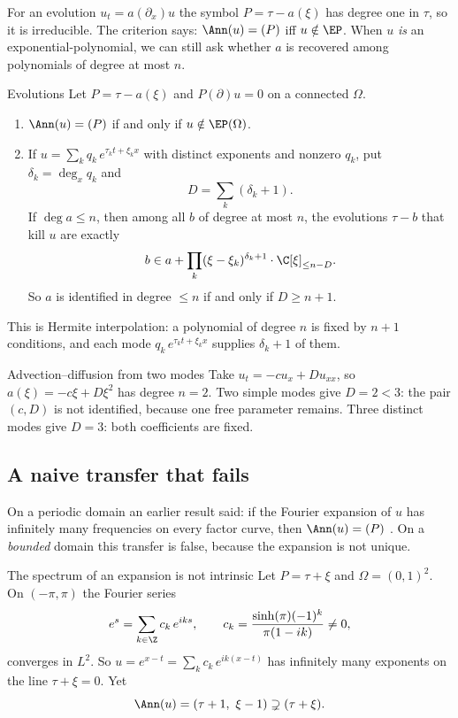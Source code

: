 For an evolution $u_t=a(\partial_x)u$ the symbol $P=\tau-a(\xi)$ has degree one in $\tau$, so it is irreducible. The criterion says: $\Ann(u)=(P)$ iff $u\notin\EP$. When $u$ \emph{is} an exponential-polynomial, we can still ask whether $a$ is recovered among polynomials of degree at most $n$.

\begin{theorem}{Evolutions  \proved}\label{thm:evol}
Let $P=\tau-a(\xi)$ and $P(\partial)u=0$ on a connected $\Omega$.
\begin{enumerate}[label=(\alph*)]
\item $\Ann(u)=(P)$ if and only if $u\notin\EP(\Omega)$.
\item If $u=\sum_kq_k\,e^{\tau_kt+\xi_kx}$ with distinct exponents and nonzero $q_k$, put $\delta_k=\deg_xq_k$ and
\[
D=\sum_k(\delta_k+1).
\]
If $\deg a\le n$, then among all $b$ of degree at most $n$, the evolutions $\tau-b$ that kill $u$ are exactly
\[
b\in a+\prod_k(\xi-\xi_k)^{\delta_k+1}\cdot\C[\xi]_{\le n-D}.
\]
So $a$ is identified in degree $\le n$ if and only if $D\ge n+1$.
\end{enumerate}
\end{theorem}

This is Hermite interpolation: a polynomial of degree $n$ is fixed by $n+1$ conditions, and each mode $q_k\,e^{\tau_kt+\xi_kx}$ supplies $\delta_k+1$ of them.

\begin{example}{Advection--diffusion from two modes}
Take $u_t=-cu_x+Du_{xx}$, so $a(\xi)=-c\xi+D\xi^2$ has degree $n=2$. Two simple modes give $D=2<3$: the pair $(c,D)$ is not identified, because one free parameter remains. Three distinct modes give $D=3$: both coefficients are fixed.
\end{example}

\subsection{A naive transfer that fails}

On a periodic domain an earlier result said: if the Fourier expansion of $u$ has infinitely many frequencies on every factor curve, then $\Ann(u)=(P)$ . On a \emph{bounded} domain this transfer is false, because the expansion is not unique.

\begin{falsebox}{The spectrum of an expansion is not intrinsic  \falsest}\label{cex:C3C1}
Let $P=\tau+\xi$ and $\Omega=(0,1)^2$. On $(-\pi,\pi)$ the Fourier series
\[
e^{s}=\sum_{k\in\Z}c_k\,e^{iks},\qquad c_k=\frac{\sinh(\pi)(-1)^k}{\pi(1-ik)}\neq0,
\]
converges in $L^2$. So $u=e^{x-t}=\sum_kc_k\,e^{ik(x-t)}$ has infinitely many exponents on the line $\tau+\xi=0$. Yet
\[
\Ann(u)=(\tau+1,\ \xi-1)\supsetneq(\tau+\xi).
\]
\end{falsebox}

